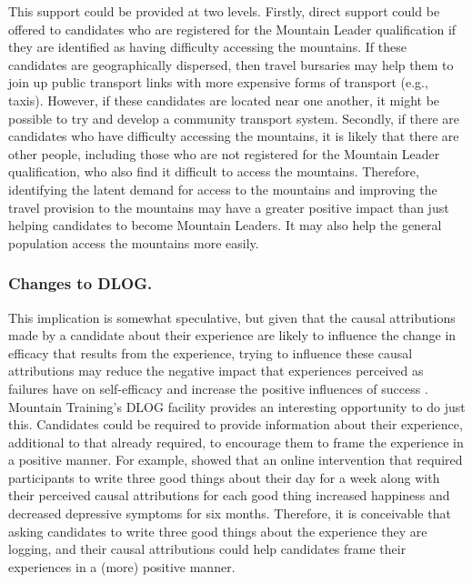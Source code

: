 \documentclass[
  12pt,
  a4paper,
]{book}
\begin{document}
This support could be provided at two levels. Firstly, direct support could be offered to candidates who are registered for the Mountain Leader qualification if they are identified as having difficulty accessing the mountains. If these candidates are geographically dispersed, then travel bursaries may help them to join up public transport links with more expensive forms of transport (e.g., taxis). However, if these candidates are located near one another, it might be possible to try and develop a community transport system. Secondly, if there are candidates who have difficulty accessing the mountains, it is likely that there are other people, including those who are not registered for the Mountain Leader qualification, who also find it difficult to access the mountains. Therefore, identifying the latent demand for access to the mountains and improving the travel provision to the mountains may have a greater positive impact than just helping candidates to become Mountain Leaders. It may also help the general population access the mountains more easily.

\hypertarget{changes-to-dlog.}{%
\subsubsection{Changes to DLOG.}\label{changes-to-dlog.}}

This implication is somewhat speculative, but given that the causal attributions made by a candidate about their experience are likely to influence the change in efficacy that results from the experience, trying to influence these causal attributions may reduce the negative impact that experiences perceived as failures have on self-efficacy and increase the positive influences of success \citep[cf.~][]{Rees2005}. Mountain Training's DLOG facility provides an interesting opportunity to do just this. Candidates could be required to provide information about their experience, additional to that already required, to encourage them to frame the experience in a positive manner. For example, \citet{Seligman2005} showed that an online intervention that required participants to write three good things about their day for a week along with their perceived causal attributions for each good thing increased happiness and decreased depressive symptoms for six months. Therefore, it is conceivable that asking candidates to write three good things about the experience they are logging, and their causal attributions could help candidates frame their experiences in a (more) positive manner.
\end{document}
